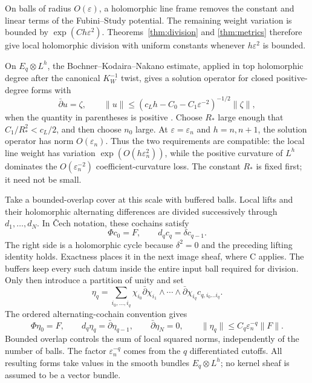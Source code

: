 \documentclass[11pt,reqno]{amsart}
\theoremstyle{remark}
\newcommand{\eps}{\varepsilon}
\newcommand{\dbar}{\bar\partial}
\providecommand{\DIFaddend}{} %
\providecommand{\DIFdelend}{} %
\begin{document}
On balls of radius $O(\eps)$, a holomorphic line
frame removes the constant and linear terms of the Fubini--Study
potential. The remaining weight variation is bounded by
$\exp(C h\eps^2)$. Theorems~\ref{thm:division} and
\ref{thm:metrics} therefore give local holomorphic division with
uniform constants whenever $h\eps^2$ is bounded.

\DIFdelend On $E_q\otimes L^h$, the Bochner--Kodaira--Nakano estimate,
applied in top holomorphic degree after the canonical $K_W^{-1}$
twist, gives a solution operator for closed positive-degree forms with
\begin{equation}\label{eq:dbar}
 \dbar u=\zeta,\qquad
 \|u\|\le(c_Lh-C_0-C_1\eps^{-2})^{-1/2}\|\zeta\|,
\end{equation}
when the quantity in parentheses is positive \cite{Demailly}.
Choose $R_*$ large enough that $C_1/R_*^2<c_L/2$, and then choose
$n_0$ large. At $\eps=\eps_n$ and $h=n,n+1$, the solution operator
has norm $O(\eps_n)$. Thus the two requirements are compatible:
the local line weight has variation $\exp(O(h\eps_n^2))$,
while the positive curvature of $L^h$ dominates the
$O(\eps_n^{-2})$ coefficient-curvature loss. The constant $R_*$ is
fixed first; it need not be small.


Take a bounded-overlap cover at this scale with buffered balls.
Local lifts and their holomorphic alternating differences are divided
successively through $d_1,\ldots,d_N$. In \v Cech notation, these
cochains satisfy
\[
\Phi c_0=F,\qquad d_qc_q=\delta c_{q-1}.
\]
The right side is a holomorphic cycle because $\delta^2=0$ and
the preceding lifting identity holds. Exactness places it in the
next image sheaf, where C applies. The buffers keep every such
datum inside the entire input ball required for division. Only then introduce a partition of unity and set
\[
 \eta_q=\sum_{i_0,\ldots,i_q}
 \chi_{i_0}\dbar\chi_{i_1}\wedge\cdots\wedge\dbar\chi_{i_q}
 c_{q,i_0\ldots i_q}.
\]
The ordered alternating-cochain convention gives
\[
\Phi\eta_0=F,\qquad
 d_q\eta_q=\dbar\eta_{q-1},\qquad
 \dbar\eta_N=0,\qquad
 \|\eta_q\|\le C_q\eps_n^{-q}\|F\|.
\]
\DIFaddend Bounded overlap controls the sum of local squared norms, independently
of the number of balls. The factor $\eps_n^{-q}$ comes from the
$q$ differentiated cutoffs. All resulting forms take values in the
smooth bundles $E_q\otimes L^h$; no kernel sheaf is assumed to be a
vector bundle.
\end{document}
